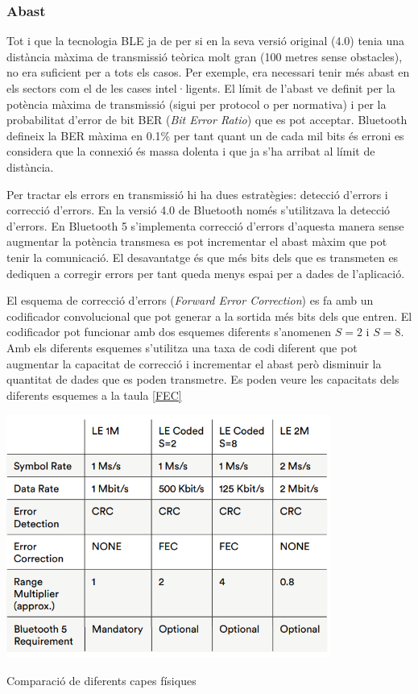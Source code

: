\subsubsection{Abast}
Tot i que la tecnologia BLE ja de per si en la seva versió original (4.0) tenia una distància màxima de transmissió teòrica molt gran (100 metres sense obstacles), no era suficient per a tots els casos.
Per exemple, era necessari tenir més abast en els sectors com el de les cases intel·ligents.
El límit de l'abast ve definit per la potència màxima de transmissió (sigui per protocol o per normativa) i per la probabilitat d'error de bit BER (\textit{Bit Error Ratio}) que es pot acceptar.
Bluetooth defineix la BER màxima en 0.1\% per tant quant un de cada mil bits és erroni es considera que la connexió és massa dolenta i que ja s'ha arribat al límit de distància.

Per tractar els errors en transmissió hi ha dues estratègies: detecció d'errors i correcció d'errors.
En la versió 4.0 de Bluetooth només s'utilitzava la detecció d'errors.
En Bluetooth 5 s'implementa correcció d'errors d'aquesta manera sense augmentar la potència transmesa es pot incrementar el abast màxim que pot tenir la comunicació.
El desavantatge és que més bits dels que es transmeten es dediquen a corregir errors per tant queda menys espai per a dades de l'aplicació.


El esquema de correcció d'errors (\textit{Forward Error Correction}) es fa amb un codificador convolucional que pot generar a la sortida més bits dels que entren. El codificador pot funcionar amb dos esquemes diferents s'anomenen $S=2$ i $S=8$.
Amb els diferents esquemes s'utilitza una taxa de codi diferent que pot augmentar la capacitat de correcció i incrementar el abast però disminuir la quantitat de dades que es poden transmetre.
Es poden veure les capacitats dels diferents esquemes a la taula \ref{FEC} 

\begin{table}[htb]
	\begin{center}
		\includegraphics[width=0.8\textwidth]{./images/LE_PHY.png}
		\caption{Comparació de diferents capes físiques}
		\label{FEC}
	\end{center}
\end{table}

